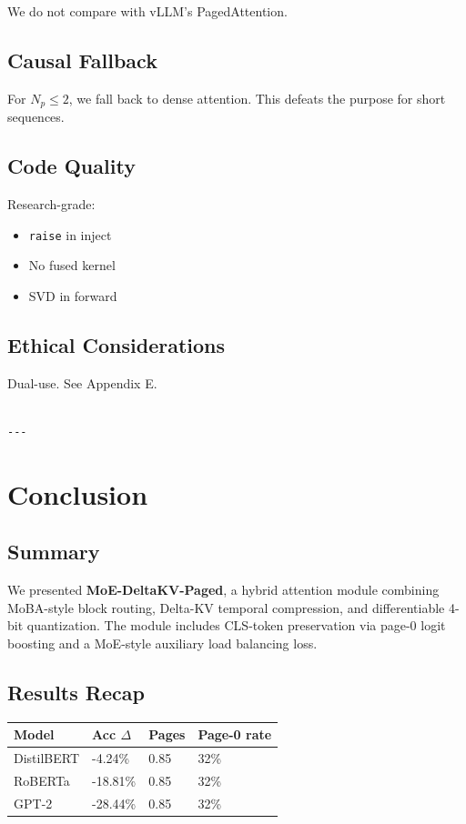 We do not compare with vLLM's PagedAttention.

\subsection{Causal Fallback}

For $N_p \leq 2$, we fall back to dense attention. This defeats the purpose 
for short sequences.

\subsection{Code Quality}

Research-grade:
\begin{itemize}
\item \texttt{raise} in inject
\item No fused kernel
\item SVD in forward

\end{itemize}
\subsection{Ethical Considerations}

Dual-use. See Appendix E.
\begin{lstlisting}

---
\end{lstlisting}

\section{Conclusion}

\subsection{Summary}

We presented \textbf{MoE-DeltaKV-Paged}, a hybrid attention module combining 
MoBA-style block routing, Delta-KV temporal compression, and differentiable 
4-bit quantization. The module includes CLS-token preservation via page-0 
logit boosting and a MoE-style auxiliary load balancing loss.

\subsection{Results Recap}

\begin{table}[H]
\centering
\small
\begin{tabular}{llll}
\toprule
\textbf{Model} & \textbf{Acc $\Delta$} & \textbf{Pages} & \textbf{Page-0 rate} \\
\midrule
DistilBERT & -4.24\% & 0.85 & 32\% \\
RoBERTa & -18.81\% & 0.85 & 32\% \\
GPT-2 & -28.44\% & 0.85 & 32\% \\
\bottomrule
\end{tabular}
\end{table}

